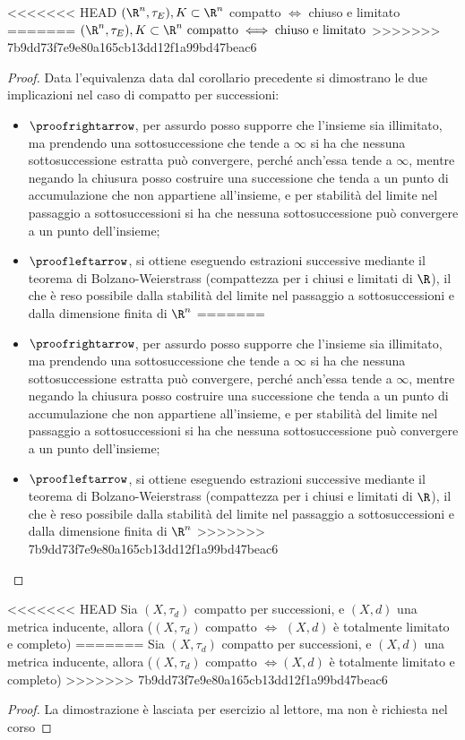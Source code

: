 \begin{prop}
<<<<<<< HEAD
$(\R^n, \tau _E), K\subset \R^n$ compatto $\iff$ chiuso e limitato
=======
$(\R^n, \tau _E), K\subset \R^n\text{ compatto} \iff\text{chiuso e limitato}$
>>>>>>> 7b9dd73f7e9e80a165cb13dd12f1a99bd47beac6
\end{prop}
\begin{proof}
Data l'equivalenza data dal corollario precedente si dimostrano le due implicazioni nel caso di compatto per successioni:
\begin{itemize}
<<<<<<< HEAD
\item $\proofrightarrow$, per assurdo posso supporre che l'insieme sia illimitato, ma prendendo una sottosuccessione che tende a $\infty$ si ha che nessuna sottosuccessione estratta può convergere, perché anch'essa tende a $\infty$, mentre negando la chiusura posso costruire una successione che tenda a un punto di accumulazione che non appartiene all'insieme, e per stabilità del limite nel passaggio a sottosuccessioni si ha che nessuna sottosuccessione può convergere a un punto dell'insieme;
\item $\proofleftarrow$, si ottiene eseguendo estrazioni successive mediante il teorema di Bolzano-Weierstrass (compattezza per i chiusi e limitati di $\R$), il che è reso possibile dalla stabilità del limite nel passaggio a sottosuccessioni e dalla dimensione finita di $\R^n$
=======
\item $\proofrightarrow$, per assurdo posso supporre che l'insieme sia illimitato, ma prendendo una sottosuccessione che tende a $\infty$ si ha che nessuna sottosuccessione estratta può convergere, perché anch'essa tende a $\infty$, mentre negando la chiusura posso costruire una successione che tenda a un punto di accumulazione che non appartiene all'insieme, e per stabilità del limite nel passaggio a sottosuccessioni si ha che nessuna sottosuccessione può convergere a un punto dell'insieme;
\item $\proofleftarrow$, si ottiene eseguendo estrazioni successive mediante il teorema di Bolzano-Weierstrass (compattezza per i chiusi e limitati di $\R$), il che è reso possibile dalla stabilità del limite nel passaggio a sottosuccessioni e dalla dimensione finita di $\R^n$
>>>>>>> 7b9dd73f7e9e80a165cb13dd12f1a99bd47beac6
\end{itemize}
\end{proof}

\begin{teo}
<<<<<<< HEAD
Sia $(X,\tau _d)$ compatto per successioni, e $(X,d)$ una metrica inducente, allora ($(X,\tau _d)$ compatto $\iff$ $(X,d)$ è totalmente limitato e completo)
=======
Sia $(X,\tau _d)$ compatto per successioni, e $(X,d)$ una metrica inducente, allora ($(X,\tau _d)$ compatto $\iff (X,d)$ è totalmente limitato e completo)
>>>>>>> 7b9dd73f7e9e80a165cb13dd12f1a99bd47beac6
\end{teo}
\begin{proof}
La dimostrazione è lasciata per esercizio al lettore, ma non è richiesta nel corso
\end{proof}

